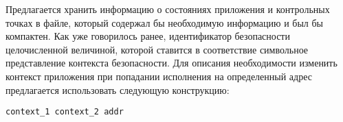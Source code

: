 \begin{comment}
Для наблюдения за состояниями приложения и переключения 
контекстов во время исполнения необходимо некоторым образом связять 
информацию об адресах контрольных точек с информацией об
изменениях контекста безопасности приложения, соответствующих
данным контрольным точкам. 

\bigskip
{\bfseries Недостатки данного подхода.} 

Основным недостатком данного подхода является необходимость
внедрять вызовы интерфейсов динамического изменения контекста
непосредственно в приложение. Предлагаемый же подход
предполагает использование немодифицированных приложений.

Это влечет за собой сразу 
несколько серьезных проблем. Во-первых, маловероятно, что 
разработчики будут делать это самостоятельно, тем более, 
что у них получится корректно выделить те участки кода, 
на которых приложению нужны различные привилегии, и 
корректно определить необходимые контексты. В таком случае, 
для обеспечения возможности использования этого метода, 
приложение должны изменять третьи разработчики, следовательно, 
такие приложения будут отличны от основной ветки и патчи 
вместе с пересборкой придется осуществлять при выходе 
каждого очередного релиза приложения. Но более 
серьезной проблемой является то, что информация передается 
непосредственно из пользовательского пространства в ядро. 
В данном случае на стороне ядра невозможно определить, 
был ли сделан данный вызов в ходе нормального хода 
выполнения приложения, либо злоумышленник изменил нормальный
ход выполнения и выполнил данный вызов с целью повышения 
прав.
\end{comment} 

\bigskip
Предлагается хранить информацию о состояниях 
приложения и контрольных точках в файле, который 
содержал бы необходимую информацию и был бы компактен.
Как уже говорилось ранее, идентификатор безопасности 
целочисленной величиной, которой ставится в соответствие 
символьное представление контекста безопасности. Для 
описания необходимости изменить контекст приложения 
при попадании исполнения на определенный адрес предлагается 
использовать следующую конструкцию: 

\bigskip
\begin{lstlisting}
context_1 context_2 addr
\end{lstlisting}

